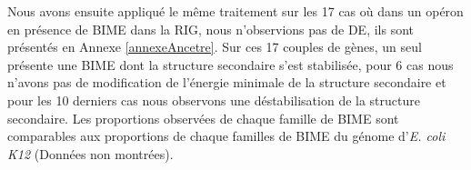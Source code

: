 \documentclass[12pt,a4paper]{report}
\begin{document}
\begin{onehalfspace}
\begin{figure}
\end{figure}

Nous avons ensuite appliqué le même traitement sur les 17 cas où dans un opéron en présence de BIME dans la RIG, nous n'observions pas de DE, ils sont présentés en Annexe \ref{annexeAncetre}. Sur ces 17 couples de gènes, un seul présente une BIME dont la structure secondaire s'est stabilisée, pour 6 cas nous n'avons pas de modification de l'énergie minimale de la structure secondaire et pour les 10 derniers cas nous observons une déstabilisation de la structure secondaire. Les proportions observées de chaque famille de BIME sont comparables aux proportions de chaque familles de BIME du génome d'\textit{E. coli K12} (Données non montrées).


\end{onehalfspace}
\end{document}
